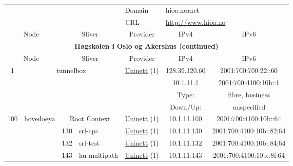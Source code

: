 \begin{small}
\begin{center}
\begin{longtable}{|c|c|c|c|c|c|c|c|}
 \multicolumn{4}{|c|}{} & \multicolumn{1}{|l|}{Domain} & \multicolumn{3}{|l|}{\index{hioa.nornet}hioa.nornet} \\* \cline{5-5}\cline{6-6}\cline{7-7}\cline{8-8}
 \multicolumn{4}{|c|}{} & \multicolumn{1}{|l|}{URL} & \multicolumn{3}{|l|}{\url{http://www.hioa.no}} \\ \hline
 \multicolumn{2}{|p{8em}|}{Node} & \multicolumn{2}{|p{8em}|}{Sliver} & \multicolumn{2}{|p{8em}|}{Provider} & IPv4 & IPv6 \\ \hline
\endfirsthead
\hline
 \multicolumn{8}{|c|}{\textbf{Høgskolen i Oslo og Akershus (continued)}} \\ \hline
 \multicolumn{2}{|p{8em}|}{Node} & \multicolumn{2}{|p{8em}|}{Sliver} & \multicolumn{2}{|p{8em}|}{Provider} & IPv4 & IPv6 \\ \hline
\endhead
 \multirow{4}{*}{\tiny{1}} & \multicolumn{3}{|c|}{\multirow{4}{*}{\tiny{tunnelbox}}} & \multicolumn{2}{|c|}{\multirow{4}{*}{\tiny{\href{https://www.uninett.no}{Uninett} (1)}}} & \tiny{128.39.120.60} & \tiny{2001:700:700:22::60} \\* \cline{7-7}\cline{8-8}
  & \multicolumn{3}{|c|}{} & \multicolumn{2}{|c|}{} & \tiny{10.1.11.1} & \tiny{2001:700:4100:10b::1} \\* \cline{7-7}\cline{8-8}
  & \multicolumn{3}{|c|}{} & \multicolumn{2}{|c|}{} & Type: & fibre, business \\* \cline{7-7}\cline{8-8}
  & \multicolumn{3}{|c|}{} & \multicolumn{2}{|c|}{} & Down/Up:  & unspecified \\ \hline
 \multirow{6}{*}{\tiny{100}} & \multicolumn{1}{|l|}{\multirow{6}{*}{\tiny{hovedoeya}}} & \multicolumn{2}{|c|}{\tiny{Root Context}} & \multicolumn{2}{|c|}{\tiny{\href{https://www.uninett.no}{Uninett} (1)}} & \tiny{10.1.11.100} & \tiny{2001:700:4100:10b::64} \\* \cline{3-3}\cline{4-4}\cline{5-5}\cline{6-6}\cline{7-7}\cline{8-8}
  &  & \tiny{130} & \multicolumn{1}{|l|}{\tiny{srl-cps}} & \multicolumn{2}{|c|}{\tiny{\href{https://www.uninett.no}{Uninett} (1)}} & \tiny{10.1.11.130} & \tiny{2001:700:4100:10b::82:64} \\* \cline{3-3}\cline{4-4}\cline{5-5}\cline{6-6}\cline{7-7}\cline{8-8}
  &  & \tiny{132} & \multicolumn{1}{|l|}{\tiny{srl-test}} & \multicolumn{2}{|c|}{\tiny{\href{https://www.uninett.no}{Uninett} (1)}} & \tiny{10.1.11.132} & \tiny{2001:700:4100:10b::84:64} \\* \cline{3-3}\cline{4-4}\cline{5-5}\cline{6-6}\cline{7-7}\cline{8-8}
  &  & \tiny{143} & \multicolumn{1}{|l|}{\tiny{hu-multipath}} & \multicolumn{2}{|c|}{\tiny{\href{https://www.uninett.no}{Uninett} (1)}} & \tiny{10.1.11.143} & \tiny{2001:700:4100:10b::8f:64} \\* \cline{3-3}\cline{4-4}\cline{5-5}\cline{6-6}\cline{7-7}\cline{8-8}

\end{longtable}
\end{center}
\end{small}
